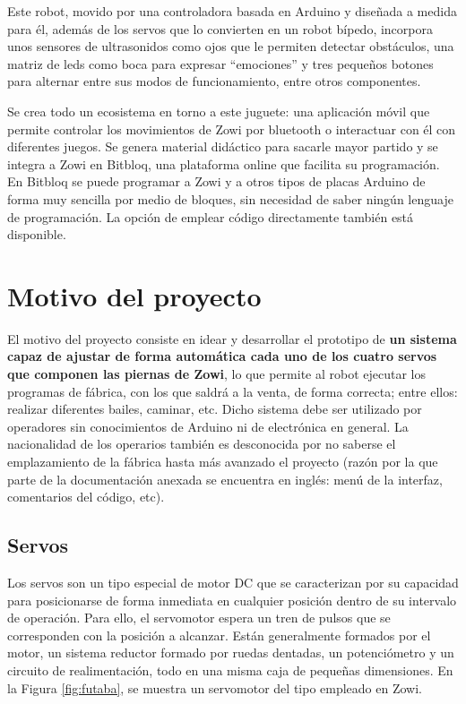 Este robot, movido por una controladora basada en Arduino y diseñada a medida para él, además de los servos que lo convierten en un robot bípedo, incorpora unos sensores de ultrasonidos como ojos que le permiten detectar obstáculos, una matriz de leds como boca para expresar ``emociones'' y tres pequeños botones para alternar entre sus modos de funcionamiento, entre otros componentes.

Se crea todo un ecosistema en torno a este juguete: una aplicación móvil que permite controlar los movimientos de Zowi por bluetooth o interactuar con él con diferentes juegos. Se genera material didáctico para sacarle mayor partido y se integra a Zowi en Bitbloq, una plataforma online que facilita su programación. En Bitbloq se puede programar a Zowi y a otros tipos de placas Arduino de forma muy sencilla por medio de bloques, sin necesidad de saber ningún lenguaje de programación. La opción de emplear código directamente también está disponible.

\section{Motivo del proyecto}
El motivo del proyecto consiste en idear y desarrollar el prototipo de \textbf{un sistema capaz de ajustar de forma automática cada uno de los cuatro servos que componen las piernas de Zowi}, lo que permite al robot ejecutar los programas de fábrica, con los que saldrá a la venta, de forma correcta; entre ellos: realizar diferentes bailes, caminar, etc. Dicho sistema debe ser utilizado por operadores sin conocimientos de Arduino ni de electrónica en general. La nacionalidad de los operarios también es desconocida por no saberse el emplazamiento de la fábrica hasta más avanzado el proyecto (razón por la que parte de la documentación anexada se encuentra en inglés: menú de la interfaz, comentarios del código, etc).

\subsection{Servos}
Los servos son un tipo especial de motor DC que se caracterizan por su capacidad para posicionarse de forma inmediata en cualquier posición dentro de su intervalo de operación. Para ello, el servomotor espera un tren de pulsos que se corresponden con la posición a alcanzar. Están generalmente formados por el motor, un sistema reductor formado por ruedas dentadas, un potenciómetro y un circuito de realimentación, todo en una misma caja de pequeñas dimensiones. En la Figura \ref{fig:futaba}, se muestra un servomotor del tipo empleado en Zowi.

